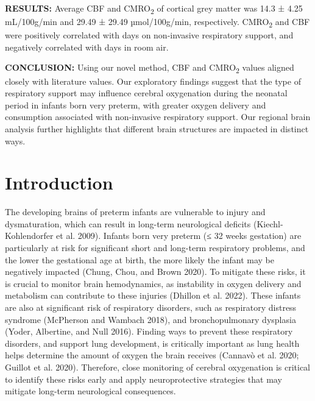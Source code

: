 \documentclass[
  letterpaper,
  DIV=11,
  numbers=noendperiod]{scrartcl}
\begin{document}
\textbf{RESULTS:} Average CBF and CMRO\textsubscript{2} of cortical grey
matter was 14.3 ± 4.25 mL/100g/min and 29.49 ± 29.49 µmol/100g/min,
respectively. CMRO\textsubscript{2} and CBF were positively correlated
with days on non-invasive respiratory support, and negatively correlated
with days in room air.

\textbf{CONCLUSION:} Using our novel method, CBF and
CMRO\textsubscript{2} values aligned closely with literature values. Our
exploratory findings suggest that the type of respiratory support may
influence cerebral oxygenation during the neonatal period in infants
born very preterm, with greater oxygen delivery and consumption
associated with non-invasive respiratory support. Our regional brain
analysis further highlights that different brain structures are impacted
in distinct ways.

\section{Introduction}\label{sec-intro}

The developing brains of preterm infants are vulnerable to injury and
dysmaturation, which can result in long-term neurological deficits
(Kiechl-Kohlendorfer et al. 2009). Infants born very preterm (≤ 32 weeks
gestation) are particularly at risk for significant short and long-term
respiratory problems, and the lower the gestational age at birth, the
more likely the infant may be negatively impacted (Chung, Chou, and
Brown 2020). To mitigate these risks, it is crucial to monitor brain
hemodynamics, as instability in oxygen delivery and metabolism can
contribute to these injuries (Dhillon et al. 2022). These infants are
also at significant risk of respiratory disorders, such as respiratory
distress syndrome (McPherson and Wambach 2018), and bronchopulmonary
dysplasia (Yoder, Albertine, and Null 2016). Finding ways to prevent
these respiratory disorders, and support lung development, is critically
important as lung health helps determine the amount of oxygen the brain
receives (Cannavò et al. 2020; Guillot et al. 2020). Therefore, close
monitoring of cerebral oxygenation is critical to identify these risks
early and apply neuroprotective strategies that may mitigate long-term
neurological consequences.
\end{document}
